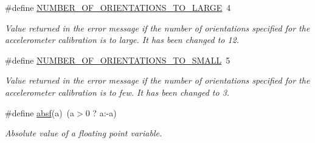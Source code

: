 \begin{DoxyCompactItemize}
\#define \hyperlink{group__nav__eq_gae34482207df685c69af65539f47656fa}{\-N\-U\-M\-B\-E\-R\-\_\-\-O\-F\-\_\-\-O\-R\-I\-E\-N\-T\-A\-T\-I\-O\-N\-S\-\_\-\-T\-O\-\_\-\-L\-A\-R\-G\-E}~4
\begin{DoxyCompactList}\small\item\em \-Value returned in the error message if the number of orientations specified for the accelerometer calibration is to large. \-It has been changed to 12. \end{DoxyCompactList}\item 
\#define \hyperlink{group__nav__eq_gad656aa8d45ef9064bf607734a3af16a1}{\-N\-U\-M\-B\-E\-R\-\_\-\-O\-F\-\_\-\-O\-R\-I\-E\-N\-T\-A\-T\-I\-O\-N\-S\-\_\-\-T\-O\-\_\-\-S\-M\-A\-L\-L}~5
\begin{DoxyCompactList}\small\item\em \-Value returned in the error message if the number of orientations specified for the accelerometer calibration is to few. \-It has been changed to 3. \end{DoxyCompactList}\item 
\#define \hyperlink{group__nav__eq_ga8add91659e5cb9c98d3a32c44269f034}{absf}(a)~(a$>$0 ? a\-:-\/a)
\begin{DoxyCompactList}\small\item\em \-Absolute value of a floating point variable. \end{DoxyCompactList}\end{DoxyCompactItemize}
